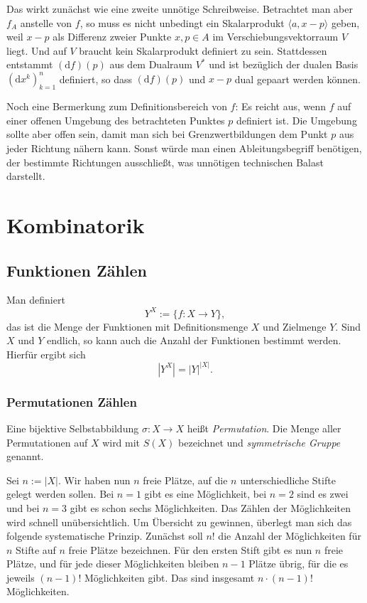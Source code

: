 \documentclass[a4paper,11pt,fleqn,twoside]{scrartcl}
\numberwithin{equation}{section}
\newcommand{\strong}[1]{{\normalfont\sffamily\bfseries #1}}
\newenvironment{Definition}{\par\noindent\strong{Definition.}}{\par}
\newcommand{\emdef}[1]{\emph{#1}}
\begin{document}
Das wirkt zunächst wie eine zweite unnötige Schreibweise. Betrachtet
man aber $f_A$ anstelle von $f$, so muss es nicht unbedingt ein
Skalarprodukt $\langle a,x-p\rangle$ geben, weil $x-p$ als
Differenz zweier Punkte $x,p\in A$ im Verschiebungsvektorraum
$V$ liegt. Und auf $V$ braucht kein Skalarprodukt definiert zu sein.
Stattdessen entstammt $(\mathrm df)(p)$ aus dem Dualraum $V^\ast$
und ist bezüglich der dualen Basis $(\mathrm dx^k)_{k=1}^n$ definiert,
so dass $(\mathrm df)(p)$ und $x-p$ dual gepaart werden können.

Noch eine Bermerkung zum Definitionsbereich von $f$: Es reicht aus,
wenn $f$ auf einer offenen Umgebung des betrachteten Punktes $p$
definiert ist. Die Umgebung sollte aber offen sein, damit man sich bei
Grenzwertbildungen dem Punkt $p$ aus jeder Richtung nähern kann.
Sonst würde man einen Ableitungsbegriff benötigen, der bestimmte
Richtungen ausschließt, was unnötigen
technischen Balast darstellt.

\section{Kombinatorik}
\subsection{Funktionen Zählen}
Man definiert
\begin{equation}
Y^X := \{f\colon X\to Y\},
\end{equation}
das ist die Menge der Funktionen mit Definitionsmenge $X$ und
Zielmenge $Y$. Sind $X$ und $Y$ endlich, so kann auch die
Anzahl der Funktionen bestimmt werden. Hierfür ergibt sich
\begin{equation}
|Y^X| = |Y|^{|X|}.
\end{equation}

\subsubsection{Permutationen Zählen}
\begin{Definition}
Eine bijektive Selbstabbildung $\sigma\colon X\to X$ heißt
\emdef{Permutation}. Die Menge aller Permutationen auf $X$ wird mit
$S(X)$ bezeichnet und \emdef{symmetrische Gruppe} genannt.
\end{Definition}
Sei $n:=|X|$. Wir haben nun $n$ freie Plätze, auf die $n$
unterschiedliche Stifte gelegt werden sollen. Bei $n=1$ gibt es
eine Möglichkeit, bei $n=2$ sind es zwei und bei $n=3$ gibt es schon
sechs Möglichkeiten. Das Zählen der Möglichkeiten wird schnell
unübersichtlich. Um Übersicht zu gewinnen, überlegt man sich das
folgende systematische Prinzip. Zunächst soll $n!$ die Anzahl der
Möglichkeiten für $n$ Stifte auf $n$ freie Plätze bezeichnen.
Für den ersten Stift gibt es nun $n$ freie Plätze, und für jede
dieser Möglichkeiten bleiben $n-1$ Plätze übrig, für die es jeweils
$(n-1)!$ Möglichkeiten gibt. Das sind insgesamt $n\cdot (n-1)!$
Möglichkeiten.
\end{document}
